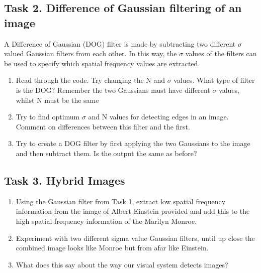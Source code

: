 \documentclass[12pt,english]{scrartcl}
\begin{document}
\subsection*{Task 2. Difference of Gaussian filtering of an image}
A Difference of Gaussian (DOG) filter is made by subtracting two different $\sigma$ valued Gaussian filters from each other. In this way, the $\sigma$ values of the filters can be used to specify which spatial frequency values are extracted.

\begin{enumerate}
 \item  Read through the code. Try changing the N and $\sigma$ values. What type of filter is the DOG? Remember the two Gaussians must have different $\sigma$ values, whilst N must be the same\\ 
 \item Try to find optimum $\sigma$ and N values for detecting edges in an image. Comment on differences between this filter and the first.\\
 \item Try to create a DOG filter by first applying the two Gaussians to the image and then subtract them. Is the output the same as before? \\
\end{enumerate}

\subsection*{Task 3. Hybrid Images}
\begin{enumerate}
 \item Using the Gaussian filter from Task 1, extract low spatial frequency information from the image of Albert Einstein provided and add this to the high spatial frequency information of the Marilyn Monroe. 
 \item Experiment with two different sigma value Gaussian filters, until up close the combined image looks like Monroe but from afar like Einstein.
 \item What does this say about the way our visual system detects images?  
\end{enumerate}
\end{document}
